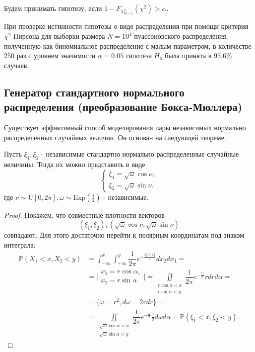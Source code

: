 \documentclass[11pt]{report}
\begin{document}
Будем принимать гипотезу, если $1-F_{\chi^2_{m-1}}(\chi^2) > \alpha$.

При проверке истинности гипотезы о виде распределения при помощи критерия $\chi^2$ Пирсона для выборки размера $N=10^4$ пуассоновского распределения, полученную как биномиальное распределение с малым параметром, в количестве 250 раз с уровнем значимости $\alpha=0.05$ гипотеза $H_0$ была принята в $95.6\%$ случаев.

\subsection{Генератор стандартного нормального распределения (преобразование Бокса-Мюллера)}

Существует эффиктивный способ моделирования пары независимых нормально распределенных случайных величин. Он основан на следующей теореме.

\begin{theorem}
Пусть $\xi_1,\xi_2$ - независимые стандартно нормально распределенные случайные величины.
Тогда их можно представить в виде
$$
\begin{cases}
\xi_1 = \sqrt{\omega}\cos\nu,\\
\xi_2 = \sqrt{\omega}\sin\nu.
\end{cases}
$$
где $\nu\sim\mathrm{U}[0,2\pi], \omega\sim\mathrm{Exp}(\frac{1}{2})$ - независимые.
\end{theorem}
\begin{proof}
Покажем, что совместные плотности векторов
$$
(\xi_1,\xi_2), (\sqrt{\omega}\cos\nu, \sqrt{\omega}\sin\nu)
$$ 
совпадают.
Для этого достаточно перейти к полярным координатам под знаком интеграла:
$$
\begin{aligned}
\mathbb{P}(X_1<x, X_2<y) &= \int_{-\infty}^{x}\int_{+\infty}^{y} \dfrac{1}{2\pi}e^{-\frac{x_1^2+x_2^2}{2}}dx_2dx_1 = \\
&= \biggl\vert \begin{array}{c}
x_1 = r\cos\alpha, \\ 
x_2 = r\sin\alpha.
\end{array} \biggr\vert = \iint\limits_{\begin{array}{c}r\cos\alpha<x\\ r\sin\alpha<y\end{array}} \dfrac{1}{2\pi}e^{-\frac{r^2}{2}}rdrd\alpha = \\
&= \{ \omega = r^2, d\omega = 2rdr \} = \\
&= \iint\limits_{\begin{array}{c}\sqrt{\omega}\cos\alpha<x\\ \sqrt{\omega}\sin\alpha<y\end{array}} \dfrac{1}{2\pi}e^{-\frac{\omega}{2}}\frac{1}{2}d\omega d\alpha = \mathbb{P}(\xi_1 < x, \xi_2 < y).
\end{aligned}
$$
\end{proof}
\end{document}
